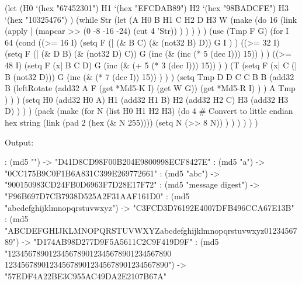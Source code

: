\begin{wideverbatim}

   (let
      (H0 `(hex "67452301")
         H1 `(hex "EFCDAB89")
         H2 `(hex "98BADCFE")
         H3 `(hex "10325476") )
      (while Str
         (let
            (A H0  B H1  C H2  D H3
               W (make
                  (do 16
                     (link
                        (apply |
                           (mapcar >> (0 -8 -16 -24) (cut 4 'Str)) ) ) ) ) )
               (use (Tmp F G)
                  (for I 64
                     (cond
                        ((>= 16 I)
                           (setq
                              F (| (\& B C) (\& (not32 B) D))
                              G I ) )
                        ((>= 32 I)
                           (setq
                              F (| (\& D B) (\& (not32 D) C))
                              G (inc (\& (inc (* 5 (dec I))) 15)) ) )
                        ((>= 48 I)
                           (setq
                              F (x| B C D)
                              G (inc (\& (+ 5 (* 3 (dec I))) 15)) ) )
                        (T
                           (setq
                              F (x| C (| B (not32 D)))
                              G (inc (\& (* 7 (dec I)) 15)) ) ) )
                     (setq
                        Tmp D
                        D C
                        C B
                        B
                        (add32 B
                           (leftRotate
                              (add32 A F (get *Md5-K I) (get W G))
                              (get *Md5-R I) ) )
                        A Tmp ) ) )
               (setq
                  H0 (add32 H0 A)
                  H1 (add32 H1 B)
                  H2 (add32 H2 C)
                  H3 (add32 H3 D) ) ) )
      (pack
         (make
            (for N (list H0 H1 H2 H3)
               (do 4  # Convert to little endian hex string
                  (link (pad 2 (hex (\& N 255))))
                  (setq N (>> 8 N)) ) ) ) ) ) )

\end{wideverbatim}

\begin{wideverbatim}

Output:

: (md5 "")
-> "D41D8CD98F00B204E9800998ECF8427E"
: (md5 "a")
-> "0CC175B9C0F1B6A831C399E269772661"
: (md5 "abc")
-> "900150983CD24FB0D6963F7D28E17F72"
: (md5 "message digest")
-> "F96B697D7CB7938D525A2F31AAF161D0"
: (md5 "abcdefghijklmnopqrstuvwxyz")
-> "C3FCD3D76192E4007DFB496CCA67E13B"
: (md5 "ABCDEFGHIJKLMNOPQRSTUVWXYZabcdefghijklmnopqrstuvwxyz0123456789")
-> "D174AB98D277D9F5A5611C2C9F419D9F"
: (md5 "1234567890123456789012345678901234567890
        1234567890123456789012345678901234567890")
-> "57EDF4A22BE3C955AC49DA2E2107B67A"

\end{wideverbatim}

